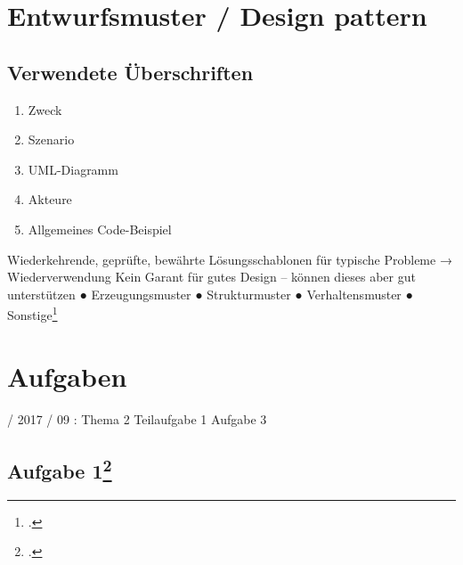 \documentclass{lehramt-informatik}
\begin{document}

\chapter{Entwurfsmuster / Design pattern}

\begin{quellen}
\item \cite{wiki:entwurfsmuster}
\end{quellen}

\section{Verwendete Überschriften}

\begin{enumerate}
\item Zweck
\item Szenario
\item UML-Diagramm
\item Akteure
\item Allgemeines Code-Beispiel
\end{enumerate}

Wiederkehrende, geprüfte, bewährte Lösungsschablonen für typische Probleme
→ Wiederverwendung
Kein Garant für gutes Design – können dieses aber gut unterstützen
● Erzeugungsmuster
● Strukturmuster
● Verhaltensmuster
● Sonstige\footcite[Seite 39]{sosy:fs:3}


\chapter{Aufgaben}

 / 2017 / 09 : Thema 2 Teilaufgabe 1 Aufgabe 3

%

\section{Aufgabe 1\footcite{sosy:ab:6}}
\end{document}
